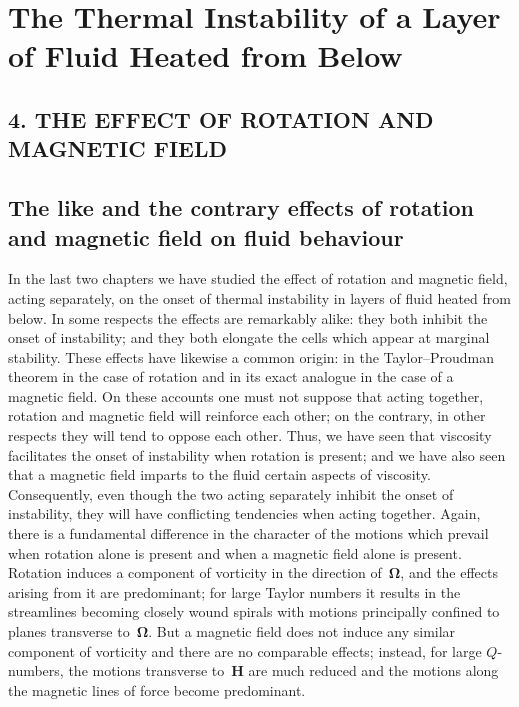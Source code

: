 %

\chapter{The Thermal Instability of a Layer of Fluid Heated from Below}
\label{ch:5}

\section*{4. THE EFFECT OF ROTATION AND MAGNETIC FIELD}

\section{The like and the contrary effects of rotation and magnetic
  field on fluid behaviour}\label{sec:49}

In the last two chapters we have studied the effect of rotation and
magnetic field, acting separately, on the onset of thermal instability in
layers of fluid heated from below.  In some respects the effects are
remarkably alike: they both inhibit the onset of instability; and they
both elongate the cells which appear at marginal stability.  These effects
have likewise a common origin: in the Taylor--Proudman theorem in
the case of rotation and in its exact analogue in the case of a magnetic
field.  On these accounts one must not suppose that acting together,
rotation and magnetic field will reinforce each other; on the contrary,
in other respects they will tend to oppose each other.  Thus, we have
seen that viscosity facilitates the onset of instability when rotation is
present; and we have also seen that a magnetic field imparts to the fluid
certain aspects of viscosity.  Consequently, even though the two acting
separately inhibit the onset of instability, they will have conflicting
tendencies when acting together.  Again, there is a fundamental difference in the character of the motions which prevail when rotation alone
is present and when a magnetic field alone is present.  Rotation induces a
component of vorticity in the direction of~$\boldsymbol{\Omega}$, and the effects arising from
it are predominant; for large Taylor numbers it results in the streamlines
becoming closely wound spirals with motions principally confined to
planes transverse to~$\boldsymbol{\Omega}$.  But a magnetic field does not induce any similar
component of vorticity and there are no comparable effects; instead, for
large $Q$-numbers, the motions transverse to~$\mathbf{H}$ are much reduced and the
motions along the magnetic lines of force become predominant.

